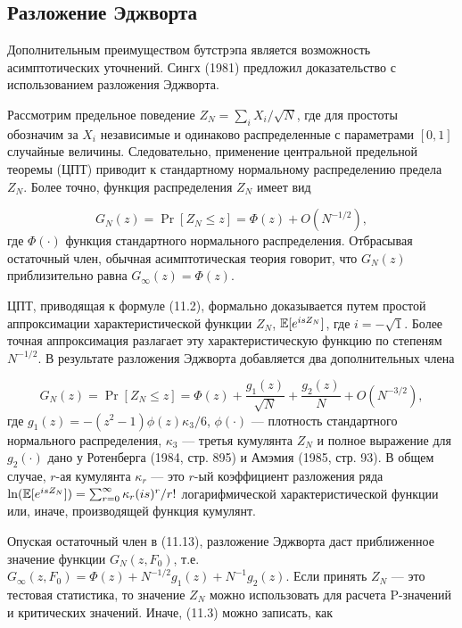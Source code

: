 \subsection{Разложение Эджворта}

Дополнительным преимуществом бутстрэпа является возможность асимптотических уточнений. Сингх (1981) предложил доказательство с использованием разложения Эджворта.

Рассмотрим предельное поведение $Z_N=\sum_{i}X_i/\sqrt{N}$, где для простоты обозначим за $X_i$ независимые и одинаково распределенные с параметрами $[0, 1]$ случайные величины. Следовательно, применение центральной предельной теоремы (ЦПТ) приводит к  стандартному нормальному распределению предела $Z_N$. Более точно,  функция распределения $Z_N$ имеет вид

\begin{equation}
G_N(z)=\Pr[Z_N \leq z] = \Phi(z) + O(N^{-1/2}),
\end{equation} 
где $\Phi(\cdot)$ функция стандартного нормального распределения. Отбрасывая остаточный член, обычная асимптотическая теория говорит, что $G_N(z)$ приблизительно равна $G_{\infty}(z)=\Phi(z)$.

ЦПТ, приводящая к формуле  (11.2), формально доказывается путем простой аппроксимации характеристической функции $Z_N$, $\mathbb{E}[e^{isZ_N}]$, где $i=-\sqrt{1}$. Более точная аппроксимация разлагает эту характеристическую функцию по степеням $N^{-1/2}$. В результате разложения Эджворта добавляется два дополнительных члена

\begin{equation}
G_N(z)=\Pr[Z_N \leq z]=\Phi(z)+\dfrac{g_1(z)}{\sqrt{N}}+\dfrac{g_2(z)}{N}+O(N^{-3/2}),
\end{equation}
где $g_1(z) = -(z^2-1)\phi(z) \kappa_3/6$, $\phi(\cdot)$ --- плотность стандартного нормального распределения, $\kappa_3$ --- третья кумулянта $Z_N$ и полное выражение для $g_2(\cdot)$ дано у Ротенберга (1984, стр. 895) и Амэмия (1985, стр. 93). В общем случае, $r$-ая кумулянта $\kappa_r$ --- это $r$-ый коэффициент разложения ряда $\ln(\mathbb{E}[e^{isZ_N}])=\sum_{r=0}^{\infty} \kappa_r(is)^r/r!$ логарифмической характеристической  функции или, иначе, производящей функция кумулянт.

Опуская остаточный член в (11.13), разложение Эджворта даст приближенное значение функции $G_N(z,F_0)$, т.е. $G_{\infty}(z,F_0)=\Phi(z)+N^{-1/2}g_1(z)+N^{-1}g_2(z)$. Если принять $Z_N$ --- это тестовая статистика, то значение $Z_N$ можно использовать для расчета P-значений и критических значений. Иначе, (11.3) можно записать, как

